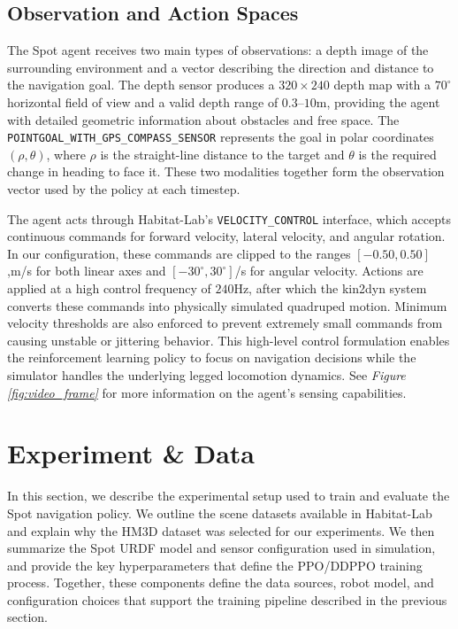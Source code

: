 \documentclass{article} %
\begin{document}
\subsection{Observation and Action Spaces}

The Spot agent receives two main types of observations: a depth image of the surrounding environment and a vector describing the direction and distance to the navigation goal. The depth sensor produces a $320\times240$ depth map with a $70^\circ$ horizontal field of view and a valid depth range of $0.3$–$10$m, providing the agent with detailed geometric information about obstacles and free space. The \texttt{POINTGOAL\_WITH\_GPS\_COMPASS\_SENSOR} represents the goal in polar coordinates $(\rho, \theta)$, where $\rho$ is the straight-line distance to the target and $\theta$ is the required change in heading to face it. These two modalities together form the observation vector used by the policy at each timestep.

The agent acts through Habitat-Lab’s \texttt{VELOCITY\_CONTROL} interface, which accepts continuous commands for forward velocity, lateral velocity, and angular rotation. In our configuration, these commands are clipped to the ranges $[-0.50, 0.50]$,m/s for both linear axes and $[-30^\circ, 30^\circ]$/s for angular velocity. Actions are applied at a high control frequency of $240$Hz, after which the kin2dyn system converts these commands into physically simulated quadruped motion. Minimum velocity thresholds are also enforced to prevent extremely small commands from causing unstable or jittering behavior. This high-level control formulation enables the reinforcement learning policy to focus on navigation decisions while the simulator handles the underlying legged locomotion dynamics. See \textit{Figure \ref{fig:video_frame}} for more information on the agent's sensing capabilities.

\section{Experiment \& Data}
In this section, we describe the experimental setup used to train and evaluate the Spot navigation policy. We outline the scene datasets available in Habitat-Lab and explain why the HM3D dataset was selected for our experiments. We then summarize the Spot URDF model and sensor configuration used in simulation, and provide the key hyperparameters that define the PPO/DDPPO training process. Together, these components define the data sources, robot model, and configuration choices that support the training pipeline described in the previous section.
\end{document}
